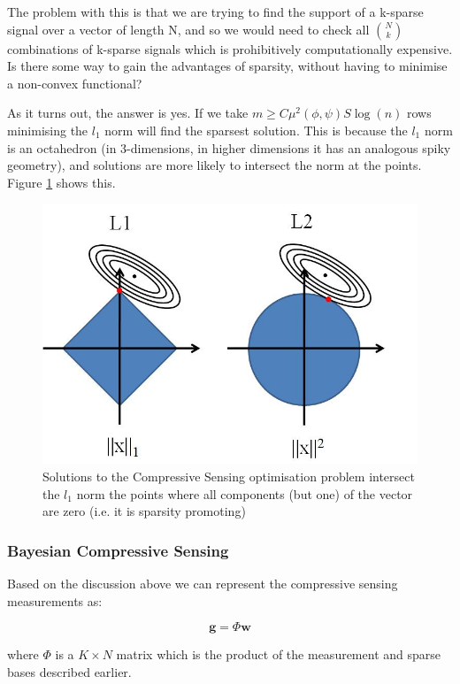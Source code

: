 \documentclass[12pt, a4paper]{article}
\begin{document}
The problem with this is that we are trying to find the support of a k-sparse signal over a vector of length N, and so we would need to check all \(N \choose k\) combinations of k-sparse signals which is prohibitively computationally expensive. Is there some way to gain the advantages of sparsity, without having to minimise a non-convex functional?

As it turns out, the answer is yes. If we take \( m \geq C \mu^2(\phi, \psi) S \log\left(n\right) \) rows minimising the \(l_{1}\) norm will find the sparsest solution. This is because the \(l_1\) norm is an octahedron (in 3-dimensions, in higher dimensions it has an analogous spiky geometry), and solutions are more likely to intersect the norm at the points. Figure \ref{l1l2} shows this.

\begin{figure}[h]
\centering
\includegraphics[height = 7 cm]{l1l2.jpg}
\caption{Solutions to the Compressive Sensing optimisation problem intersect the \(l_1\) norm the points where all components (but one) of the vector are zero (i.e. it is sparsity promoting) \cite{Tibshirani1996}}
\label{l1l2}
\end{figure}

\subsubsection{Bayesian Compressive Sensing}
Based on the discussion above we can represent the compressive sensing measurements as: 

\begin{equation}
\textbf{g} = \Phi	\textbf{w}
\end{equation}

where \(\Phi\) is a \(K \times	N\) matrix which is the product of the measurement and sparse bases described earlier.
\end{document}
